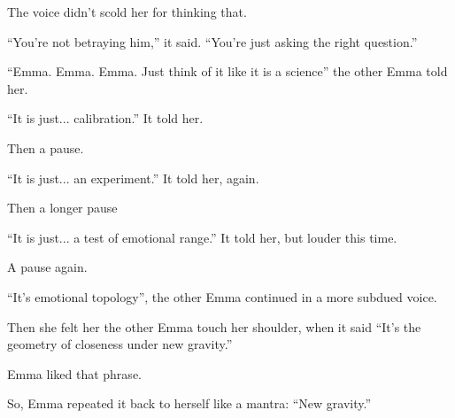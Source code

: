 The voice didn’t scold her for thinking that.

``You’re not betraying him,'' it said. ``You’re just asking the right question.''

``Emma. Emma. Emma. Just think of it like it is a science'' the other Emma told her.

``It is just... calibration.'' It told her.

Then a pause.

``It is just... an experiment.'' It told her, again.

Then a longer pause

``It is just... a test of emotional range.'' It told her, but louder this time.

A pause again.

``It's emotional topology'', the other Emma continued in a more subdued voice.

Then she felt her the other Emma touch her shoulder, when it said
``It's the geometry of closeness under new gravity.''

Emma liked that phrase. 

So, Emma repeated it back to herself like a mantra: ``New gravity.''

\medskip


